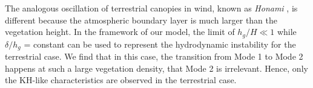 \documentclass[12pt]{report}   %
\newcommand{\hg}{h_g}
\begin{document}
The analogous oscillation of terrestrial canopies in wind, known as \textit{Honami} \cite{Inoue56,Raupach96}, is different because the atmospheric boundary layer is much larger than the vegetation height.
In the framework of our model, the limit of $\hg/H \ll 1$ while $\delta/\hg$ = constant can be used to represent the hydrodynamic instability for the terrestrial case.
We find that in this case, the transition from Mode 1 to Mode 2 happens at such a large vegetation density, that Mode 2 is irrelevant. 
Hence, only the KH-like characteristics are observed in the terrestrial case. 


%
\clearpage{\pagestyle{empty}\cleardoublepage}






\appendix
\end{document}
